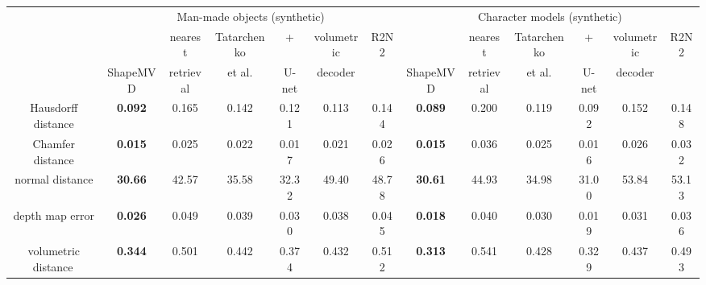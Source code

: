 \documentclass[10pt, conference, compsocconf]{IEEEtran}
\begin{document}
\begin{table*}[h]
\centering
\small

\newcommand{\ShapeMVD}{{\!\!\!\footnotesize ShapeMVD}}
\begin{tabular}{@{}c@{}||c@{\,}|@{\,}c@{\,}|@{\,}c@{\,}|@{\,\,}c@{\,\,}|@{\,}c@{\,}|@{\,\,}c@{\,}||
                         c@{\,}|@{\,}c@{\,}|@{\,}c@{\,}|@{\,\,}c@{\,\,}|@{\,}c@{\,}|@{\,\,}c@{}}
     & \multicolumn{6}{c||}{Man-made objects (synthetic)} & \multicolumn{6}{c}{Character models (synthetic)} \\
     &           & nearest   & Tatarchenko                       & \cite{tatarchenko2016multi}+ & volumetric & R2N2
     &           & nearest   & Tatarchenko                       & \cite{tatarchenko2016multi}+ & volumetric & R2N2              \\
     & \ShapeMVD & retrieval & et al.\cite{tatarchenko2016multi} & U-net                        & decoder    & \cite{choy20163d}
     & \ShapeMVD & retrieval & et al.\cite{tatarchenko2016multi} & U-net                        & decoder    & \cite{choy20163d} \\
\hline
Hausdorff distance    & \textbf{0.092} & 0.165 & 0.142 & 0.121 & 0.113 & 0.144      & \textbf{0.089} & 0.200 & 0.119 & 0.092 & 0.152 & 0.148 \\
Chamfer distance      & \textbf{0.015} & 0.025 & 0.022 & 0.017 & 0.021 & 0.026      & \textbf{0.015} & 0.036 & 0.025 & 0.016 & 0.026 & 0.032 \\
normal distance       & \textbf{30.66} & 42.57 & 35.58 & 32.32 & 49.40 & 48.78      & \textbf{30.61} & 44.93 & 34.98 & 31.00 & 53.84 & 53.13 \\
depth map error       & \textbf{0.026} & 0.049 & 0.039 & 0.030 & 0.038 & 0.045      & \textbf{0.018} & 0.040 & 0.030 & 0.019 & 0.031 & 0.036 \\
volumetric distance\, & \textbf{0.344} & 0.501 & 0.442 & 0.374 & 0.432 & 0.512      & \textbf{0.313} & 0.541 & 0.428 & 0.329 & 0.437 & 0.493 \\
\end{tabular}


\end{table*}
\end{document}
